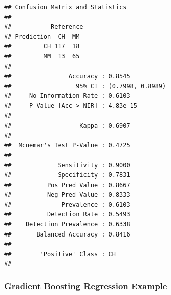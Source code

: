 \documentclass[]{book}
\newenvironment{Shaded}{\begin{snugshade}}{\end{snugshade}}
\newcommand{\CommentTok}[1]{\textcolor[rgb]{0.56,0.35,0.01}{\textit{#1}}}
\newcommand{\DataTypeTok}[1]{\textcolor[rgb]{0.13,0.29,0.53}{#1}}
\newcommand{\DecValTok}[1]{\textcolor[rgb]{0.00,0.00,0.81}{#1}}
\newcommand{\KeywordTok}[1]{\textcolor[rgb]{0.13,0.29,0.53}{\textbf{#1}}}
\newcommand{\NormalTok}[1]{#1}
\newcommand{\OperatorTok}[1]{\textcolor[rgb]{0.81,0.36,0.00}{\textbf{#1}}}
\newcommand{\StringTok}[1]{\textcolor[rgb]{0.31,0.60,0.02}{#1}}
\begin{document}
\begin{Shaded}
\end{Shaded}

\begin{verbatim}
## Confusion Matrix and Statistics
## 
##           Reference
## Prediction  CH  MM
##         CH 117  18
##         MM  13  65
##                                           
##                Accuracy : 0.8545          
##                  95% CI : (0.7998, 0.8989)
##     No Information Rate : 0.6103          
##     P-Value [Acc > NIR] : 4.83e-15        
##                                           
##                   Kappa : 0.6907          
##                                           
##  Mcnemar's Test P-Value : 0.4725          
##                                           
##             Sensitivity : 0.9000          
##             Specificity : 0.7831          
##          Pos Pred Value : 0.8667          
##          Neg Pred Value : 0.8333          
##              Prevalence : 0.6103          
##          Detection Rate : 0.5493          
##    Detection Prevalence : 0.6338          
##       Balanced Accuracy : 0.8416          
##                                           
##        'Positive' Class : CH              
## 
\end{verbatim}

\begin{Shaded}
\end{Shaded}

\hypertarget{gradient-boosting-regression-example}{%
\subsubsection{Gradient Boosting Regression Example}\label{gradient-boosting-regression-example}}
\end{document}
